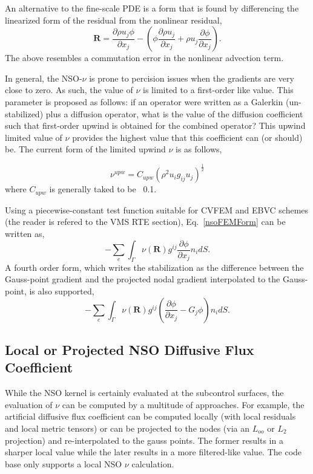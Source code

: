 An alternative to the fine-scale PDE is a form that is found by differencing the linearized
form of the residual from the nonlinear residual,
\begin{equation}
 \mathbf{R} = \frac{\partial \rho u_j \phi }{\partial x_j} - (\phi \frac{\partial \rho u_j }{\partial x_j} + \rho u_j \frac{\partial \phi}{\partial x_j}).
 \label{nsoResidualAlt}
\end{equation}
The above resembles a commutation error in the nonlinear advection term.

In general, the NSO-$\nu$ is prone to percision issues when the gradients are very close to 
zero. As such, the value of $\nu$ is limited to a first-order like value. This parameter is 
proposed as follows: if an operator were written as a Galerkin (un-stabilized) plus a diffusion 
operator, what is the value of the diffusion coefficient such that first-order upwind is obtained 
for the combined operator? This upwind limited value of $\nu$ provides the highest value that 
this coefficient can (or should) be. The current form of the limited upwind $\nu$ is as follows,

\begin{equation}
  \nu^{upw} = C_{upw}(\rho^2  u_i g_{ij} u_j )^{\frac{1}{2}}
\label{nsoFVForm}
\end{equation}
where $C_{upw}$ is generally taked to be ~0.1.

Using a piecewise-constant test function suitable for CVFEM and EBVC schemes (the reader is refered to 
the VMS RTE section), Eq.~\ref{nsoFEMForm} can be written as,
\begin{equation}
  -\sum_e \int_\Gamma \nu(\mathbf{R}) g^{ij} \frac{\partial \phi} {\partial x_j} n_i dS.
\label{nsoFVForm}
\end{equation}
%
A fourth order form, which writes the stabilization as the difference between the Gauss-point gradient 
and the projected nodal gradient interpolated to the Gauss-point, is also supported,
\begin{equation}
  -\sum_e \int_\Gamma \nu(\mathbf{R}) g^{ij} (\frac{\partial \phi} {\partial x_j} - G_j \phi ) n_i dS.
\label{nsoFVForm4th}
\end{equation}

\subsection{Local or Projected NSO Diffusive Flux Coefficient}
While the NSO kernel is certainly evaluated at the subcontrol surfaces, the evaluation of $\nu$ can be 
computed by a multitude of approaches. For example, the artificial diffusive flux coefficient 
can be computed locally (with local residuals and local metric tensors) or can be projected 
to the nodes (via an $L_{oo}$ or $L_2$ projection) and re-interpolated to the gauss points. 
The former results in a sharper local value while the later results in a more filtered-like value.
The code base only supports a local NSO $\nu$ calculation.

